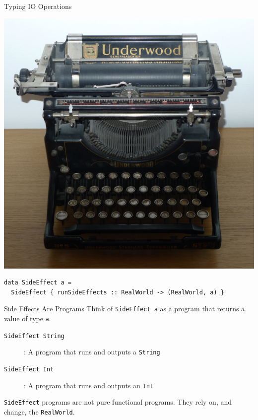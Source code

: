 \documentclass[10pt, presentation, colorlinks]{beamer}
\begin{document}
\begin{frame}[label={sec:org4ecf48c},fragile]{Typing IO Operations}
 \begin{center}
\includegraphics[height=0.4\textheight]{./img/typewriter.JPG}
\end{center}

\bigskip

\begin{verbatim}
data SideEffect a =
  SideEffect { runSideEffects :: RealWorld -> (RealWorld, a) }
\end{verbatim}
\end{frame}

\begin{frame}[label={sec:org0c9b4ce},fragile]{Side Effects Are Programs}
 Think of \texttt{SideEffect a} as a \alert{program} that returns a value of type
\texttt{a}.

\bigskip

\begin{description}
\item[{\texttt{SideEffect String}}] : A program that runs and outputs a \texttt{String}
\item[{\texttt{SideEffect Int}}] : A program that runs and outputs an \texttt{Int}
\end{description}

\bigskip

\texttt{SideEffect} programs are not pure functional programs. They rely on, and change, the \texttt{RealWorld}.
\end{frame}
\end{document}
